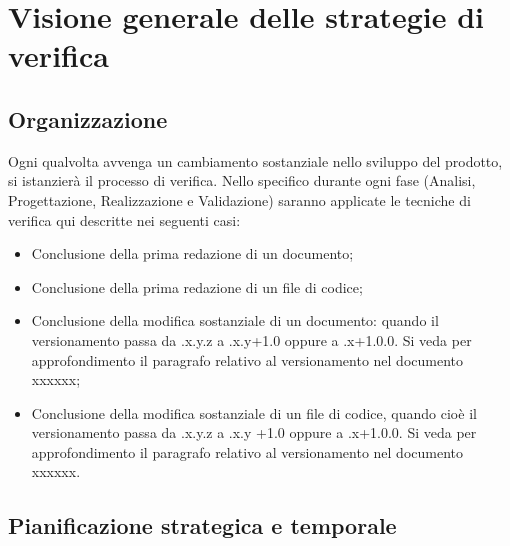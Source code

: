 
\section{Visione generale delle strategie di verifica}

\subsection{Organizzazione}

Ogni qualvolta avvenga un cambiamento sostanziale nello sviluppo del prodotto, si istanzierà il processo di verifica.
Nello specifico durante ogni fase (Analisi, Progettazione, Realizzazione e Validazione) saranno applicate le tecniche di verifica qui descritte nei seguenti casi:
\begin{itemize}

\item Conclusione della prima redazione di un documento;

\item Conclusione della prima redazione di un file di codice;

\item Conclusione della modifica sostanziale di un documento: quando il versionamento passa da .x.y.z a .x.y+1.0 oppure a .x+1.0.0. Si veda per approfondimento il paragrafo relativo al versionamento nel documento xxxxxx;

\item Conclusione della modifica sostanziale di un file di codice, quando cioè il versionamento passa da .x.y.z a .x.y +1.0 oppure a .x+1.0.0. Si veda per approfondimento il paragrafo relativo al versionamento nel documento xxxxxx.
\end{itemize}
\subsection{Pianificazione strategica e temporale}

